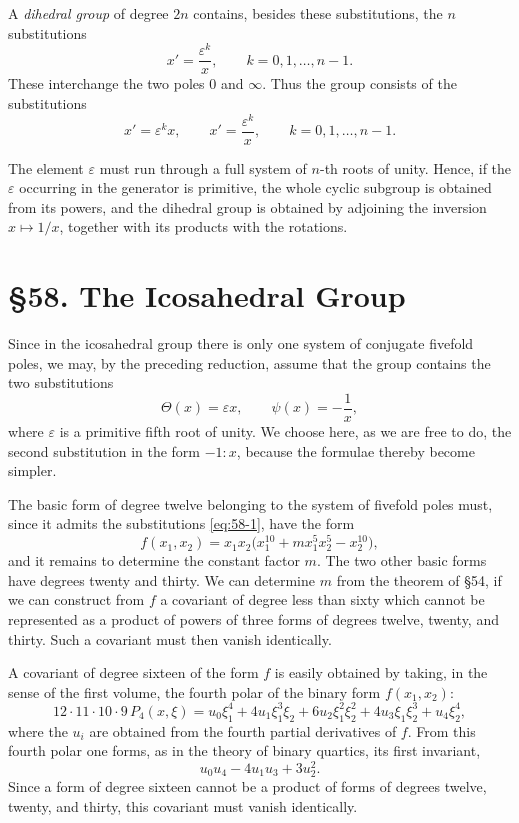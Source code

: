 \documentclass[11pt,a4paper]{book}
\newcommand{\webersection}[2]{\clearpage\section*{\S #1. #2}}
\newcommand{\eps}{\varepsilon}
\begin{document}
A \emph{dihedral group} of degree \(2n\) contains, besides these substitutions, the \(n\) substitutions
\begin{equation}
x'=\frac{\varepsilon^k}{x},
\qquad k=0,1,\ldots,n-1.
\end{equation}
These interchange the two poles \(0\) and \(\infty\).  Thus the group consists of the substitutions
\begin{equation}
x'=\varepsilon^k x,\qquad
x'=\frac{\varepsilon^k}{x},
\qquad k=0,1,\ldots,n-1.
\end{equation}

The element \(\varepsilon\) must run through a full system of \(n\)-th roots of unity.  Hence, if the \(\varepsilon\) occurring in the generator is primitive, the whole cyclic subgroup is obtained from its powers, and the dihedral group is obtained by adjoining the inversion \(x\mapsto 1/x\), together with its products with the rotations.

\newpage

\webersection{58}{The Icosahedral Group}

Since in the icosahedral group there is only one system of conjugate fivefold poles, we may, by the preceding reduction, assume that the group contains the two substitutions
\begin{equation}\label{eq:58-1}
 \Theta(x)=\eps x, \qquad \psi(x)=-\frac1x,
\end{equation}
where \(\eps\) is a primitive fifth root of unity.  We choose here, as we are free to do, the second substitution in the form \(-1:x\), because the formulae thereby become simpler.

The basic form of degree twelve belonging to the system of fivefold poles must, since it admits the substitutions \eqref{eq:58-1}, have the form
\begin{equation}\label{eq:58-2}
 f(x_1,x_2)=x_1x_2\bigl(x_1^{10}+m x_1^5x_2^5-x_2^{10}\bigr),
\end{equation}
and it remains to determine the constant factor \(m\).  The two other basic forms have degrees twenty and thirty.  We can determine \(m\) from the theorem of \S 54, if we can construct from \(f\) a covariant of degree less than sixty which cannot be represented as a product of powers of three forms of degrees twelve, twenty, and thirty.  Such a covariant must then vanish identically.

A covariant of degree sixteen of the form \(f\) is easily obtained by taking, in the sense of the first volume, the fourth polar of the binary form \(f(x_1,x_2)\):
\begin{equation}\label{eq:58-polar}
 12\cdot 11\cdot 10\cdot 9\, P_4(x,\xi)=u_0\xi_1^4+4u_1\xi_1^3\xi_2+6u_2\xi_1^2\xi_2^2+4u_3\xi_1\xi_2^3+u_4\xi_2^4,
\end{equation}
where the \(u_i\) are obtained from the fourth partial derivatives of \(f\).  From this fourth polar one forms, as in the theory of binary quartics, its first invariant,
\begin{equation}\label{eq:58-3}
 u_0u_4-4u_1u_3+3u_2^2.
\end{equation}
Since a form of degree sixteen cannot be a product of forms of degrees twelve, twenty, and thirty, this covariant must vanish identically.
\end{document}
